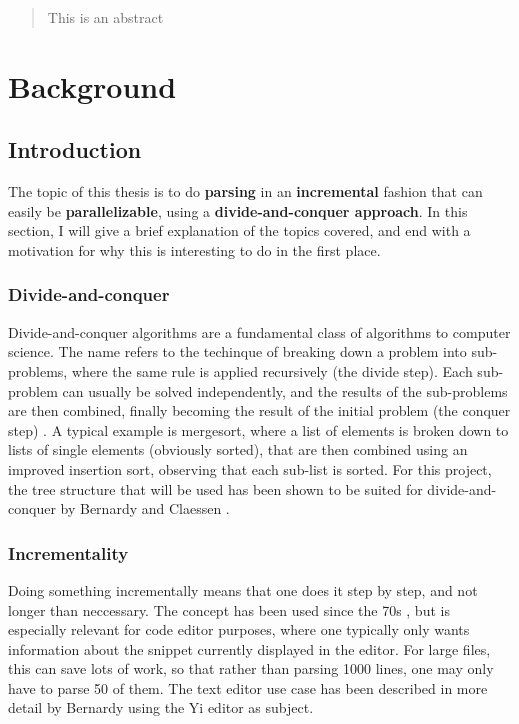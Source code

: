 \documentclass[a4paper,12pt,twosided]{report}
\begin{document}


\begin{abstract}
This is an abstract
\end{abstract}

\tableofcontents

%
%

\chapter{Background}

\section{Introduction}
The topic of this thesis is to do \textbf{parsing} in an \textbf{incremental}
fashion that can easily be \textbf{parallelizable}, using a
\textbf{divide-and-conquer approach}. In this section, I will give a brief
explanation of the topics covered, and end with a motivation for why this is
interesting to do in the first place.

\subsection{Divide-and-conquer}
Divide-and-conquer algorithms are a fundamental class of algorithms to computer
science. The name refers to the techinque of breaking down a problem into
sub-problems, where the same rule is applied recursively (the divide step). Each
sub-problem can usually be solved independently, and the results of the
sub-problems are then combined, finally becoming the result of the initial
problem (the conquer step) \cite[p.209]{algorithmdesign}. A typical example is
mergesort, where a list of elements is broken down to lists of single elements
(obviously sorted), that are then combined using an improved insertion sort,
observing that each sub-list is sorted. For this project, the tree structure
that will be used has been shown to be suited for divide-and-conquer by Bernardy
and Claessen \cite{parparsepaper}.

\subsection{Incrementality}
Doing something incrementally means that one does it step by step, and not
longer than neccessary. The concept has been used since the 70s
\cite{incrementalpaper}, but is especially relevant for code editor purposes,
where one typically only wants information about the snippet currently displayed
in the editor. For large files, this can save lots of work, so that rather than
parsing 1000 lines, one may only have to parse 50 of them. The text editor use
case has been described in more detail by Bernardy \cite{lazyfunctional} using
the Yi editor as subject. 
\end{document}
